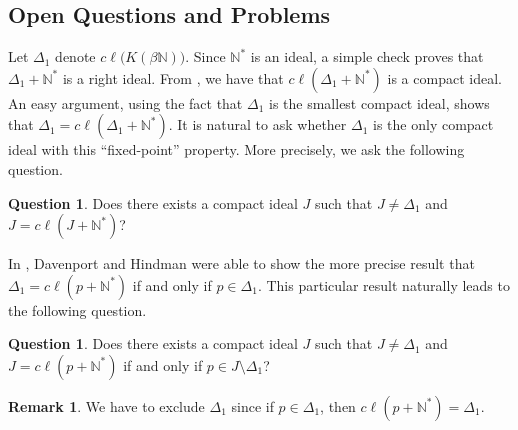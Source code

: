 \documentclass[12pt]{article}
\theoremstyle{plain}
\theoremstyle{definition}
\newtheorem{rmk}[thm]{Remark}
\newtheorem{ques}[thm]{Question}
\newcommand{\bbN}{\mathbb{N}}
\begin{document}
\subsection{Open Questions and Problems}
Let $\Delta_1$ denote $c\ell\bigl(K(\beta\bbN)\bigr)$.
Since $\bbN^*$ is an ideal, a simple check proves that $\Delta_1 +
\bbN^*$ is a right ideal.
From \cite[Theorem 2.19(a)]{Hindman:1998fk}, we have that
$c\ell(\Delta_1 + \bbN^*)$ is a compact ideal.
An easy argument, using the fact that $\Delta_1$ is the smallest
compact ideal, shows that $\Delta_1 = c\ell(\Delta_1+\bbN^*)$.
It is natural to ask whether $\Delta_1$ is the only compact
ideal with this ``fixed-point'' property.
More precisely, we ask the following question.
\begin{ques}
  Does there exists a compact ideal $J$ such that $J \ne \Delta_1$ and
  $J = c\ell(J+\bbN^*)$?
\end{ques}
In \cite[Lemma 3.3]{Davenport:1987uq}, Davenport and Hindman were able
to show the more precise result that $\Delta_1 = c\ell(p+\bbN^*)$ if
and only if $p \in \Delta_1$.
This particular result naturally leads to the following question.
\begin{ques}
  Does there exists a compact ideal $J$ such that $J \ne \Delta_1$ and
  $J = c\ell(p + \bbN^*)$ if and only if $p \in J\setminus \Delta_1$?
\end{ques}
\begin{rmk}
  We have to exclude $\Delta_1$ since if $p \in \Delta_1$, then
  $c\ell(p+\bbN^*) = \Delta_1$.
\end{rmk}
\end{document}

